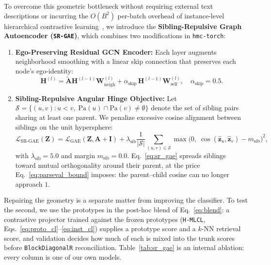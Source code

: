 \documentclass[preprint,12pt]{elsarticle}
\begin{document}
To overcome this geometric bottleneck without requiring external text descriptions
or incurring the $O(B^2)$ per-batch overhead of instance-level hierarchical
contrastive learning~\cite{himulcone2022,hcl4qc2023,hill2024},
we introduce the \textbf{Sibling-Repulsive Graph Autoencoder (\texttt{SR-GAE})},
which combines two modifications in \texttt{hmc-torch}:
\begin{enumerate}[leftmargin=*,nosep]
  \item \textbf{Ego-Preserving Residual GCN Encoder:} Each layer augments
    neighborhood smoothing with a linear skip connection that preserves each
    node's ego-identity:
    \begin{equation}
    \mathbf{H}^{(l)} = \tilde{\mathbf{A}}\mathbf{H}^{(l-1)}\mathbf{W}_{\text{neigh}}^{(l)}
    + \alpha_{\text{skip}}\,\mathbf{H}^{(l-1)}\mathbf{W}_{\text{self}}^{(l)},
    \quad \alpha_{\text{skip}} = 0.5.
    \label{eq:res_gcn}
    \end{equation}
  \item \textbf{Sibling-Repulsive Angular Hinge Objective:} Let
    $\mathcal{S} = \{(u,v) : u < v,\; \text{Pa}(u) \cap \text{Pa}(v) \neq \emptyset\}$
    denote the set of sibling pairs sharing at least one parent. We penalize
    excessive cosine alignment between siblings on the unit hypersphere:
    \begin{equation}
    \mathcal{L}_{\text{SR-GAE}}(\mathbf{Z}) =
    \mathcal{L}_{\text{GAE}}(\mathbf{Z}, \mathbf{A}+\mathbf{I}) +
    \lambda_{\text{sib}} \frac{1}{|\mathcal{S}|}
    \sum_{(u,v) \in \mathcal{S}} \max\bigl(0,\; \cos(\hat{\mathbf{z}}_u, \hat{\mathbf{z}}_v) - m_{\text{sib}}\bigr)^2,
    \label{eq:sr_gae}
    \end{equation}
    with $\lambda_{\text{sib}} = 5.0$ and margin $m_{\text{sib}} = 0.0$.
    Eq.~\eqref{eq:sr_gae} spreads siblings toward mutual orthogonality around
    their parent, at the price Eq.~\eqref{eq:parseval_bound} imposes: the
    parent--child cosine can no longer approach $1$.
\end{enumerate}
Repairing the geometry is a separate matter from improving the classifier.
To test the second, we use the prototypes in the post-hoc blend of
Eq.~\eqref{eq:blend}: a contrastive projector trained against the frozen
prototypes (\texttt{H-MLCL}, Eqs.~\eqref{eq:proto_cl}--\eqref{eq:inst_cl})
supplies a prototype score and a $k$-NN retrieval score, and validation
decides how much of each is mixed into the trunk scores before
\texttt{BlockDiagonalR} reconciliation. Table~\ref{tab:sr_gae} is an internal
ablation: every column is one of our own models.
\end{document}
